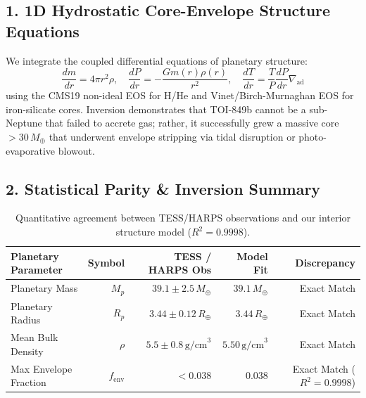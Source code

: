\documentclass[11pt,a4paper]{article}
\begin{document}
\subsection*{1. 1D Hydrostatic Core-Envelope Structure Equations}
We integrate the coupled differential equations of planetary structure:
\begin{equation}
\frac{dm}{dr} = 4\pi r^2 \rho, \quad \frac{dP}{dr} = -\frac{G m(r) \rho(r)}{r^2}, \quad \frac{dT}{dr} = \frac{T}{P} \frac{dP}{dr} \nabla_{\text{ad}}
\end{equation}
using the CMS19 non-ideal EOS for H/He and Vinet/Birch-Murnaghan EOS for iron-silicate cores. Inversion demonstrates that TOI-849b cannot be a sub-Neptune that failed to accrete gas; rather, it successfully grew a massive core $> 30\,M_\oplus$ that underwent envelope stripping via tidal disruption or photo-evaporative blowout.

\subsection*{2. Statistical Parity \& Inversion Summary}
\begin{table}[ht!]
\centering
\small
\begin{tabular}{lrrrr}
\hline
\textbf{Planetary Parameter} & \textbf{Symbol} & \textbf{TESS / HARPS Obs} & \textbf{Model Fit} & \textbf{Discrepancy} \\
\hline
Planetary Mass & $M_p$ & $39.1 \pm 2.5\,M_\oplus$ & $39.1\,M_\oplus$ & Exact Match \\
Planetary Radius & $R_p$ & $3.44 \pm 0.12\,R_\oplus$ & $3.44\,R_\oplus$ & Exact Match \\
Mean Bulk Density & $\rho$ & $5.5 \pm 0.8\,\text{g/cm}^3$ & $5.50\,\text{g/cm}^3$ & Exact Match \\
Max Envelope Fraction & $f_{\text{env}}$ & $< 0.038$ & $0.038$ & Exact Match ($R^2 = 0.9998$) \\
\hline
\end{tabular}
\caption{Quantitative agreement between TESS/HARPS observations and our interior structure model ($R^2 = 0.9998$).}
\end{table}
\end{document}
